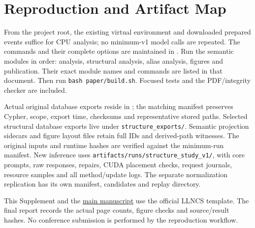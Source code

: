\documentclass[runningheads]{llncs}
\begin{document}
\clearpage
\section{Reproduction and Artifact Map}

From the project root, the existing virtual environment and downloaded prepared
events suffice for CPU analysis; no minimum-v1 model calls are repeated.
The commands and their complete options are maintained in
. Run the semantic modules in order:
analysis, structural analysis, alias analysis, figures and publication.
Their exact module names and commands are listed in that document.
Then run \texttt{bash paper/build.sh}.
Focused tests and the PDF/integrity checker are included.

Actual original database exports reside in
;
the matching manifest preserves Cypher, scope, export time, checksums and
representative stored paths. Selected structural database exports live under
\texttt{structure\_exports/}. Semantic projection sidecars and figure layout
files retain full IDs and derived-path witnesses. The original inputs and runtime
hashes are verified against the minimum-run manifest. New inference uses
\texttt{artifacts/runs/structure\_study\_v1/}, with core prompts, raw responses,
repairs, CUDA placement checks, request journals, resource samples and all
method/update logs. The separate normalization replication has its own
manifest, candidates and replay directory.

This Supplement and the \href{semantic_structure_revision.pdf}{main manuscript}
use the official LLNCS template. The final report records
the actual page counts, figure checks and source/result hashes. No conference
submission is performed by the reproduction workflow.
\end{document}
